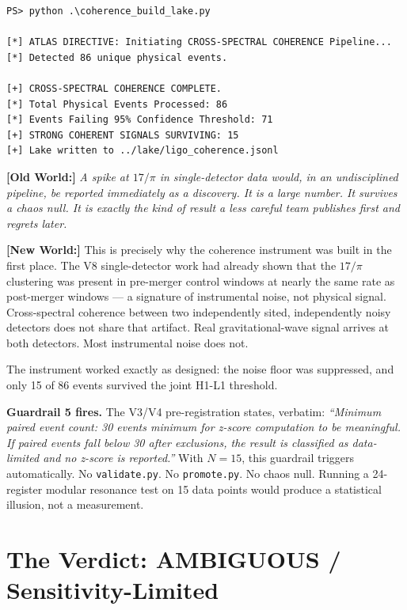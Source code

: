 \documentclass[11pt, letterpaper, openany]{book}
\newcommand{\oldworld}[1]{\noindent\textbf{\color{goldseal}[Old World:]}
  \textit{#1}\medskip}
\newcommand{\newworld}[1]{\noindent\textbf{\color{kishblue}[New World:]}
  #1\medskip}
\begin{document}
\begin{lstlisting}[style=terminal]
PS> python .\coherence_build_lake.py

[*] ATLAS DIRECTIVE: Initiating CROSS-SPECTRAL COHERENCE Pipeline...
[*] Detected 86 unique physical events.

[+] CROSS-SPECTRAL COHERENCE COMPLETE.
[*] Total Physical Events Processed: 86
[*] Events Failing 95% Confidence Threshold: 71
[+] STRONG COHERENT SIGNALS SURVIVING: 15
[+] Lake written to ../lake/ligo_coherence.jsonl
\end{lstlisting}

\oldworld{A spike at $17/\pi$ in single-detector data would, in an
undisciplined pipeline, be reported immediately as a discovery. It is a
large number. It survives a chaos null. It is exactly the kind of result
a less careful team publishes first and regrets later.}

\newworld{This is precisely why the coherence instrument was built in the
first place. The V8 single-detector work had already shown that the
$17/\pi$ clustering was present in pre-merger control windows at nearly
the same rate as post-merger windows --- a signature of instrumental noise,
not physical signal. Cross-spectral coherence between two independently
sited, independently noisy detectors does not share that artifact. Real
gravitational-wave signal arrives at both detectors. Most instrumental
noise does not.}

The instrument worked exactly as designed: the noise floor was
suppressed, and only 15 of 86 events survived the joint H1-L1 threshold.

\begin{warningbox}
\textbf{Guardrail 5 fires.} The V3/V4 pre-registration states, verbatim:
\textit{``Minimum paired event count: 30 events minimum for z-score
computation to be meaningful. If paired events fall below 30 after
exclusions, the result is classified as data-limited and no z-score is
reported.''} With $N=15$, this guardrail triggers automatically. No
\texttt{validate.py}. No \texttt{promote.py}. No chaos null. Running a
24-register modular resonance test on 15 data points would produce a
statistical illusion, not a measurement.
\end{warningbox}

\section{The Verdict: AMBIGUOUS / Sensitivity-Limited}
\end{document}
